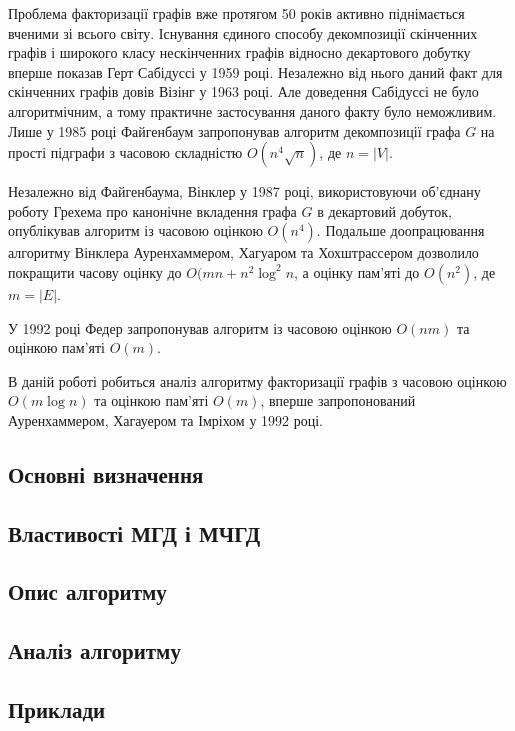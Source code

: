 Проблема факторизації графів вже протягом 50 років активно піднімається вченими зі всього світу.
Існування єдиного способу декомпозиції скінченних графів і широкого класу нескінченних графів відносно декартового добутку вперше показав Герт Сабідуссі у 1959 році\cite{sabidussi1959gm}.
Незалежно від нього даний факт для скінченних графів довів Візінг у 1963 році\cite{vizing1963cpf}.
Але доведення Сабідуссі не було алгоритмічним, а тому практичне застосування даного факту було неможливим.
Лише у 1985 році Файгенбаум запропонував алгоритм декомпозиції графа $G$ на прості підграфи з часовою складністю $O(n^4\sqrt n)$, де $n=\vert V \vert$\cite{feigenbaum1985ptafpfcpg}.

Незалежно від Файгенбаума, Вінклер у 1987 році, використовуючи об'єднану роботу Грехема про канонічне вкладення графа $G$ в декартовий добуток, опублікував алгоритм із часовою оцінкою $O(n^4)$.
Подальше доопрацювання алгоритму Вінклера Ауренхаммером, Хагуаром та Хох\-штрассером дозволило покращити часову оцінку до $O(mn+n^2\log^2n$, а оцінку пам'яті до $O(n^2)$, де $m=\vert E \vert$.

У 1992 році Федер запропонував алгоритм із часовою оцінкою $O(nm)$ та оцінкою пам'яті $O(m)$\cite{feder1992pgr}.

В даній роботі робиться аналіз алгоритму факторизації графів з часовою оцінкою $O(m\log n)$ та оцінкою пам'яті $O(m)$, вперше запропонований Ауренхаммером, Хагауером та Імріхом у 1992 році\cite{aurenhammer1992cgflce}.

\newpage
\subsection{Основні визначення}


\newpage
\subsection{Властивості МГД і МЧГД}


\newpage
\subsection{Опис алгоритму}


\newpage
\subsection{Аналіз алгоритму}


\newpage
\subsection{Приклади}

